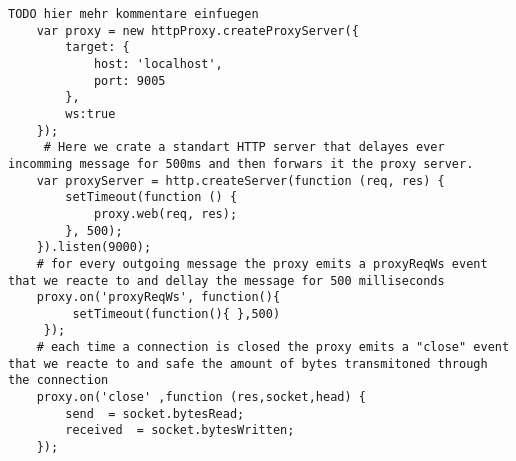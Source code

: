   \label{the_label}				
 \begin{lstlisting}[caption={Setting up a proxy that simulates latency with node-http-proxy}]
  TODO hier mehr kommentare einfuegen
 	var proxy = new httpProxy.createProxyServer({
 		target: {
 			host: 'localhost',
 			port: 9005
 		},
 		ws:true 
 	});
 	 # Here we crate a standart HTTP server that delayes ever incomming message for 500ms and then forwars it the proxy server.
 	var proxyServer = http.createServer(function (req, res) {
 		setTimeout(function () {
 			proxy.web(req, res);
 		}, 500);
 	}).listen(9000);
 	# for every outgoing message the proxy emits a proxyReqWs event that we reacte to and dellay the message for 500 milliseconds
 	proxy.on('proxyReqWs', function(){
 		 setTimeout(function(){ },500) 
 	 });
  	# each time a connection is closed the proxy emits a "close" event that we reacte to and safe the amount of bytes transmitoned through the connection
 	proxy.on('close' ,function (res,socket,head) { 
 		send  = socket.bytesRead;
 		received  = socket.bytesWritten;
 	});
 \end{lstlisting}

 